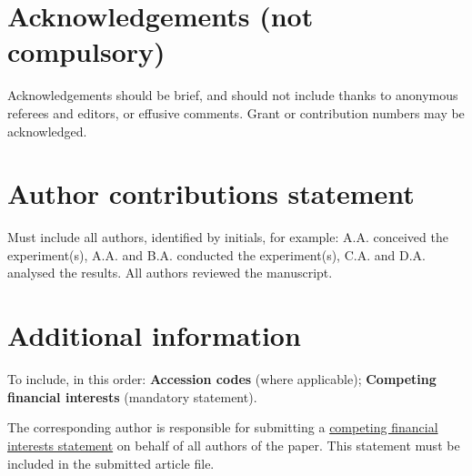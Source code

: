 \documentclass[fleqn,10pt]{wlscirep}
\begin{document}


\section*{Acknowledgements (not compulsory)}

Acknowledgements should be brief, and should not include thanks to anonymous referees and editors, or effusive comments. Grant or contribution numbers may be acknowledged.

\section*{Author contributions statement}
Must include all authors, identified by initials, for example:
A.A. conceived the experiment(s),  A.A. and B.A. conducted the experiment(s), C.A. and D.A. analysed the results.  All authors reviewed the manuscript. 

\section*{Additional information}

To include, in this order: \textbf{Accession codes} (where applicable); \textbf{Competing financial interests} (mandatory statement). 

The corresponding author is responsible for submitting a \href{http://www.nature.com/srep/policies/index.html#competing}{competing financial interests statement} on behalf of all authors of the paper. This statement must be included in the submitted article file.
\end{document}
